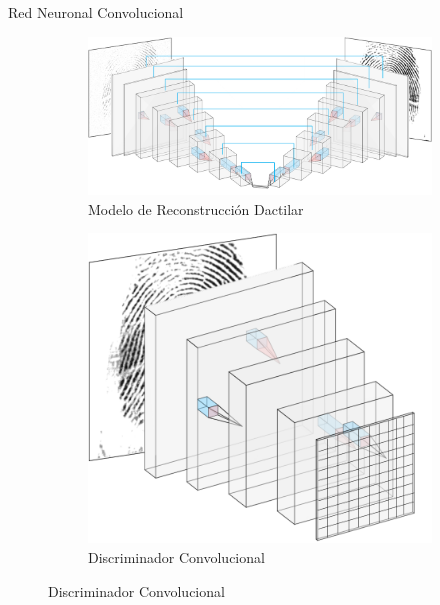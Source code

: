 \documentclass[12pt,aspectratio=169]{beamer}
\begin{document}
\begin{frame}{Red Neuronal Convolucional}

   \begin{figure}[h]
        \begin{subfigure}{0.62\textwidth}
            \centering
            \includegraphics[scale=0.34]{figs/layers_nn_u.PNG}  
            \caption{Modelo de Reconstrucción Dactilar}
        \end{subfigure}
        \begin{subfigure}{0.36\textwidth}
            \centering
            \includegraphics[scale=0.25]{figs/disc_cuad.png} 
            \caption{Discriminador Convolucional}
        \end{subfigure}
    \end{figure}

\end{frame}
\end{document}
